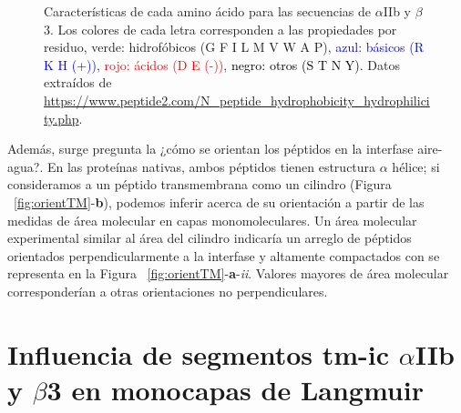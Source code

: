\begin{figure}[ht]
    \caption{Características de cada amino ácido para las secuencias de $\alpha$IIb y $\beta$3. Los colores de cada letra corresponden a las propiedades por residuo, \textcolor{mygreen}{verde: hidrofóbicos (G F I L M V W A P)}, \textcolor{blue}{azul: básicos (R K H (+))}, \textcolor{red}{rojo: ácidos (D E (-))}, \textcolor{black}{negro: otros (S T N Y)}. Datos extraídos de \url{https://www.peptide2.com/N_peptide_hydrophobicity_hydrophilicity.php}.
    }
    \label{fig:secuencia}
\end{figure}
Además, surge pregunta la ¿cómo se orientan los péptidos en la interfase aire-agua?. En las proteínas nativas, ambos péptidos tienen estructura $\alpha$ hélice; si consideramos a un péptido transmembrana como un cilindro (Figura ~\ref{fig:orientTM}-\textbf{b}), podemos inferir acerca de su orientación a partir de las medidas de área molecular en capas monomoleculares. Un área molecular experimental similar al área del cilindro indicaría un arreglo de péptidos orientados perpendicularmente a la interfase y altamente compactados con se representa en la Figura ~\ref{fig:orientTM}-\textbf{a}-\textit{ii}. Valores mayores de área molecular corresponderían a otras orientaciones no perpendiculares.




\section{Influencia de segmentos \ac{tm}-\ac{ic}  $\alpha$IIb  y $\beta$3 en monocapas de Langmuir}

